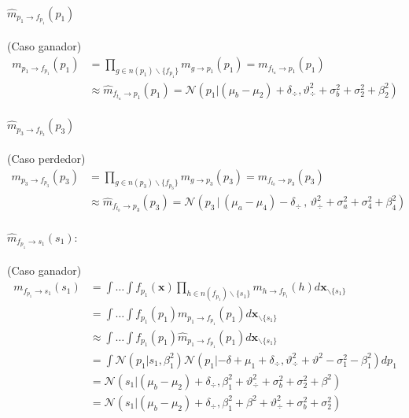\documentclass[11pt,twoside,spanish]{report} %
\begin{document}
\paragraph{$\widehat{m}_{p_1 \rightarrow f_{p_1}}(p_1)$} (Caso ganador)
\begin{equation}
	\begin{split}
		m_{ p_1\rightarrow f_{p_1}}(p_1) &=  \prod_{g \in n(p_1) \backslash  \{f_{p_1} \}} m_{g \rightarrow p_1} (p_1)= m_{f_{t_a} \rightarrow p_1}(p_1) \\
		&\approx \widehat{m}_{f_{t_a} \rightarrow p_1}(p_1) =  \mathcal{N}( p_1 |  (\mu_b - \mu_2) + \delta_{\div} ,\vartheta_{\div}^2 + \sigma_b^2 + \sigma_2^2 + \beta_2^2)
	\end{split}
\end{equation}

\paragraph{$\widehat{m}_{p_3 \rightarrow f_{p_3}}(p_3)$} (Caso perdedor)
\begin{equation}
	\begin{split}
		m_{ p_3\rightarrow f_{p_3}}(p_3) &= \prod_{g \in n(p_3) \backslash  \{f_{p_3} \}} m_{g \rightarrow p_3} (p_3) = m_{f_{t_b} \rightarrow p_3}(p_3)\\
		&\approx \widehat{m}_{f_{t_b} \rightarrow p_3}(p_3)=  \mathcal{N}( p_3 \,|\,  (\mu_a - \mu_4) - \delta_{\div}  \,,\,\vartheta_{\div}^2 + \sigma_a^2 + \sigma_4^2 + \beta_4^2)
	\end{split}
\end{equation}



\paragraph{$\widehat{m}_{f_{p_1} \rightarrow s_1}(s_1):$} (Caso ganador)
\begin{equation}
	\begin{split}
		m_{f_{p_1} \rightarrow s_1}(s_1) & = \int \dots \int f_{p_1}(\textbf{x}) \prod_{h \in n(f_{p_1}) \backslash \{s_1\} } m_{h \rightarrow f_{p_1}}(h)  d\textbf{x}_{\backslash \{s_1\} }  \\
		&= \int \dots \int f_{p_1}(p_1)m_{p_1 \rightarrow f_{p_1}}(p_1) d\textbf{x}_{\backslash \{s_1\} }  \\
		&\approx \int \dots \int f_{p_1}(p_1)\widehat{m}_{p_1 \rightarrow f_{p_1}}(p_1) d\textbf{x}_{\backslash \{s_1\} }  \\
		&= \int  \mathcal{N}(p_1| s_1, \beta_1^2)  \mathcal{N}( p_1 |  -\delta + \mu_1 + \delta_{\div} ,\vartheta_{\div}^2 + \vartheta^2 -\sigma_1^2 - \beta_1^2)   dp_1 \\
		&=  \mathcal{N}( s_1|(\mu_b - \mu_2) + \delta_{\div} , \beta_1^2+\vartheta_{\div}^2 + \sigma_b^2 + \sigma_2^2 + \beta^2) \\
		&=  \mathcal{N}( s_1|(\mu_b - \mu_2) + \delta_{\div} ,\beta_1^2+ \beta^2+\vartheta_{\div}^2 + \sigma_b^2 + \sigma_2^2)
	\end{split}
\end{equation}
\end{document}
